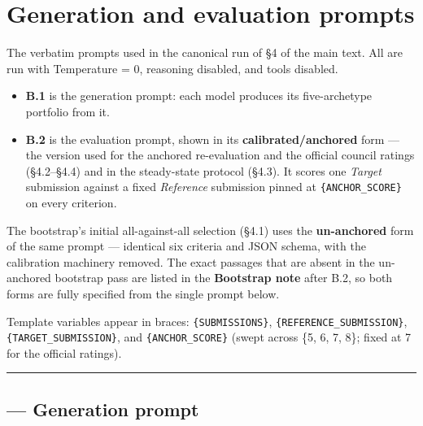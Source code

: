 \documentclass{article}
\providecommand{\tightlist}{\setlength{\itemsep}{0pt}\setlength{\parskip}{0pt}}
\begin{document}
\section{Generation and evaluation prompts}\label{generation-and-evaluation-prompts}

The verbatim prompts used in the canonical run of \S{}4 of the main text. All are run with Temperature = 0, reasoning disabled, and tools disabled.

\begin{itemize}
\tightlist
\item
  \textbf{B.1} is the generation prompt: each model produces its five-archetype portfolio from it.
\item
  \textbf{B.2} is the evaluation prompt, shown in its \textbf{calibrated/anchored} form --- the version used for the anchored re-evaluation and the official council ratings (\S{}4.2--\S{}4.4) and in the steady-state protocol (\S{}4.3). It scores one \emph{Target} submission against a fixed \emph{Reference} submission pinned at \texttt{\{ANCHOR\_\allowbreak{}SCORE\}} on every criterion.
\end{itemize}

The bootstrap's initial all-against-all selection (\S{}4.1) uses the \textbf{un-anchored} form of the same prompt --- identical six criteria and JSON schema, with the calibration machinery removed. The exact passages that are absent in the un-anchored bootstrap pass are listed in the \textbf{Bootstrap note} after B.2, so both forms are fully specified from the single prompt below.

Template variables appear in braces: \texttt{\{SUBMISSIONS\}}, \texttt{\{REFERENCE\_\allowbreak{}SUBMISSION\}}, \texttt{\{TARGET\_\allowbreak{}SUBMISSION\}}, and \texttt{\{ANCHOR\_\allowbreak{}SCORE\}} (swept across \{5, 6, 7, 8\}; fixed at 7 for the official ratings).

\begin{center}\rule{0.5\linewidth}{0.5pt}\end{center}

\subsection{--- Generation prompt}\label{generation-prompt}
\end{document}

